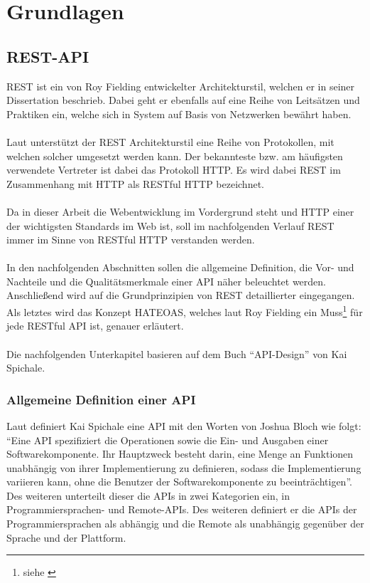
\chapter{Grundlagen}

\section{REST-API}
\gls{REST} ist ein von Roy Fielding entwickelter Architekturstil, welchen er in seiner Dissertation \cite{dissertationFielding} beschrieb. Dabei geht er ebenfalls auf eine Reihe von Leitsätzen und Praktiken ein, welche sich in System auf Basis von Netzwerken bewährt haben.\\
\\
Laut \cite[143]{apiDesign} unterstützt der REST Architekturstil eine Reihe von Protokollen, mit welchen solcher umgesetzt werden kann. Der bekannteste bzw. am häufigsten verwendete Vertreter ist dabei das Protokoll \gls{HTTP}. Es wird dabei \gls{REST} im Zusammenhang mit \gls{HTTP} als RESTful \gls{HTTP} bezeichnet. \\
\\
Da in dieser Arbeit die Webentwicklung im Vordergrund steht und \gls{HTTP} einer der wichtigsten Standards im Web ist, soll im nachfolgenden Verlauf \gls{REST} immer im Sinne von RESTful \gls{HTTP} verstanden werden.\\
\\
In den nachfolgenden Abschnitten sollen die allgemeine Definition, die Vor- und Nachteile und die Qualitätsmerkmale einer \gls{API} näher beleuchtet werden. Anschließend wird auf die Grundprinzipien von \gls{REST} detaillierter eingegangen. Als letztes wird das Konzept HATEOAS, welches laut Roy Fielding ein Muss\footnote{siehe \cite{restMustBeHypertextDriven}} für jede RESTful \gls{API} ist, genauer erläutert.\\
\\
Die nachfolgenden Unterkapitel basieren auf dem Buch \enquote{API-Design} \cite[7-10, 13-14, 144-148, 189]{apiDesign} von Kai Spichale.

\subsection{Allgemeine Definition einer \gls{API}}\label{sec:defAPI}
Laut \cite[7]{apiDesign} definiert Kai Spichale eine \gls{API} mit den Worten von Joshua Bloch wie folgt: \enquote{Eine API spezifiziert die Operationen sowie die Ein- und Ausgaben einer Softwarekomponente. Ihr Hauptzweck besteht darin, eine Menge an Funktionen unabhängig von ihrer Implementierung zu definieren, sodass die Implementierung variieren kann, ohne die Benutzer der Softwarekomponente zu beeinträchtigen}. Des weiteren unterteilt dieser die \glspl{API} in zwei Kategorien ein, in Programmiersprachen- und Remote-\glspl{API}. Des weiteren definiert er die \glspl{API} der Programmiersprachen als abhängig und die Remote als unabhängig gegenüber der Sprache und der Plattform.

